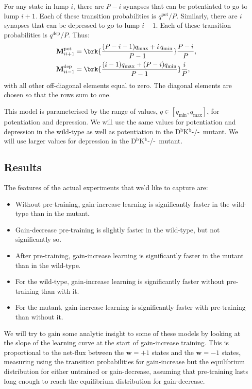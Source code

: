 \documentclass[12pt]{article}
\newcommand{\w}{\mathbf{w}}
\newcommand{\M}{\mathbf{M}}
\newcommand{\pot}{^{\text{pot}}}
\newcommand{\dep}{^{\text{dep}}}
\newcommand{\KO}{D$^\mathrm{b}$K$^\mathrm{b}$-/-}
\newcommand{\lmax}{_{\text{max}}}
\newcommand{\lmin}{_{\text{min}}}
\begin{document}
For any state in lump $i$, there are $P-i$ synapses that can be potentiated to go to lump $i+1$.
Each of these transition probabilities is $q\pot/P$.
Similarly, there are $i$ synapses that can be depressed to go to lump $i-1$.
Each of these transition probabilities is $q\dep/P$.
Thus:
%
\begin{equation}\label{eq:pooledpotdep}
  \begin{aligned}
    \M\pot_{ii+1} &=  \brk{\frac{(P-i-1)q\lmax + i\,q\lmin}{P-1}} \frac{P-i}{P}, \\
    \M\dep_{ii-1} &=  \brk{\frac{(i-1)q\lmax + (P-i)q\lmin}{P-1}} \frac{i}{P},
  \end{aligned}
\end{equation}
%
with all other off-diagonal elements equal to zero.
The diagonal elements are chosen so that the rows sum to one.

This model is parameterised by the range of values, $q\in[q\lmin,q\lmax]$, for potentiation and depression.
We will use the same values for potentiation and depression in the wild-type as well as potentiation in the \KO\ mutant.
We will use larger values for depression in the \KO\ mutant.


\subsection{Results}\label{sec:results}

The features of the actual experiments that we'd like to capture are:
\begin{itemize}
  \item Without pre-training, gain-increase learning is significantly faster in the wild-type than in the mutant.
  \item Gain-decrease pre-training is slightly faster in the wild-type, but not significantly so.
  \item After pre-training, gain-increase learning is significantly faster in the mutant than in the wild-type.
  \item For the wild-type, gain-increase learning is significantly faster without pre-training than with it.
  \item For the mutant, gain-increase learning is significantly faster with pre-training than without it.
\end{itemize}

We will try to gain some analytic insight to some of these models by looking at the slope of the learning curve at the start of gain-increase training.
This is proportional to the net-flux between the $\w=+1$ states and the $\w=-1$ states, measuring using the transition probabilities for gain-increase but the equilibrium distribution for either untrained or gain-decrease, assuming that pre-training lasts long enough to reach the equilibrium distribution for gain-decrease.
\end{document}
